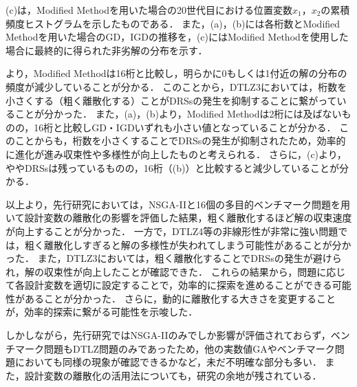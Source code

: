 \documentclass[../main/main]{subfiles}
\begin{document}
\begin{description}
\quad {}(c)は，Modified Methodを用いた場合の20世代目における位置変数$x_1$，$x_2$の累積頻度ヒストグラムを示したものである．
また，(a)，(b)には各桁数とModified Methodを用いた場合のGD，IGDの推移を，(c)にはModified Methodを使用した場合に最終的に得られた非劣解の分布を示す．

\quad {}より，Modified Methodは16桁と比較し，明らかに0もしくは1付近の解の分布の頻度が減少していることが分かる．
このことから，DTLZ3においては，桁数を小さくする（粗く離散化する）ことがDRSsの発生を抑制することに繋がっていることが分かった．
また，(a)，(b)より，Modified Methodは2桁には及ばないものの，16桁と比較しGD・IGDいずれも小さい値となっていることが分かる．
このことからも，桁数を小さくすることでDRSsの発生が抑制されたため，効率的に進化が進み収束性や多様性が向上したものと考えられる．
さらに，(c)より，ややDRSsは残っているものの，16桁（(b)）と比較すると減少していることが分かる．

\quad 以上より，先行研究においては，NSGA-IIと16個の多目的ベンチマーク問題を用いて設計変数の離散化の影響を評価した結果，粗く離散化するほど解の収束速度が向上することが分かった．
一方で，DTLZ4等の非線形性が非常に強い問題では，粗く離散化しすぎると解の多様性が失われてしまう可能性があることが分かった．
また，DTLZ3においては，粗く離散化することでDRSsの発生が避けられ，解の収束性が向上したことが確認できた．
これらの結果から，問題に応じて各設計変数を適切に設定することで，効率的に探索を進めることができる可能性があることが分かった．
さらに，動的に離散化する大きさを変更することが，効率的探索に繋がる可能性を示唆した．

\quad しかしながら，先行研究ではNSGA-IIのみでしか影響が評価されておらず，ベンチマーク問題もDTLZ問題のみであったため，他の実数値GAやベンチマーク問題においても同様の現象が確認できるかなど，未だ不明確な部分も多い．
また，設計変数の離散化の活用法についても，研究の余地が残されている．


\end{description}
\end{document}
